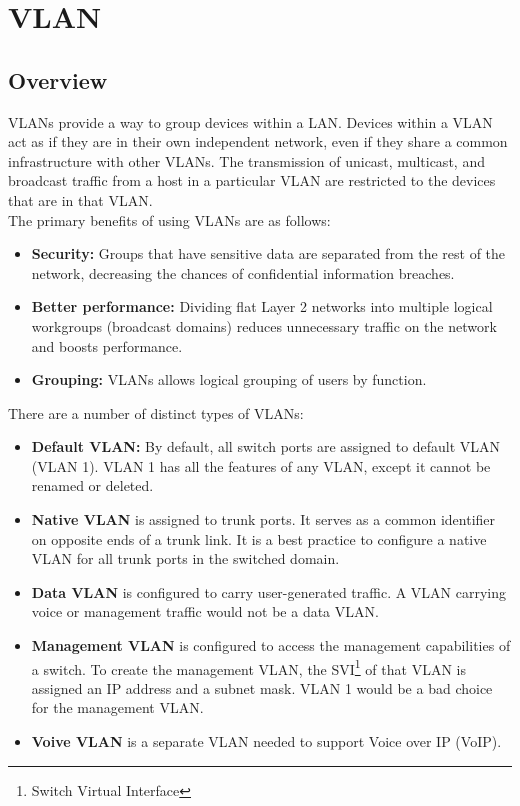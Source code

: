 \chapter{VLAN}

\section{Overview}

VLANs provide a way to group devices within a LAN. Devices within a VLAN act as if they are in their own independent network, even if they share a common infrastructure with other VLANs. The transmission of unicast, multicast, and broadcast traffic from a host in a particular VLAN are restricted to the devices that are in that VLAN.\\

The primary benefits of using VLANs are as follows:

\begin{itemize}
\item \textbf{Security:} Groups that have sensitive data are separated from the rest of the network, decreasing the chances of confidential information breaches. 

\item \textbf{Better performance:} Dividing flat Layer 2 networks into multiple logical workgroups (broadcast domains) reduces unnecessary traffic on the network and
boosts performance.

\item \textbf{Grouping:} VLANs allows logical grouping of users by function. 
\end{itemize}

There are a number of distinct types of VLANs: 

\begin{itemize}
\item \textbf{Default VLAN:} By default, all switch ports are assigned to default VLAN (VLAN 1). VLAN 1 has all the features of any VLAN, except it cannot be renamed or deleted.

\item \textbf{Native VLAN} is assigned to trunk ports. It serves as a common identifier on opposite ends of a trunk link. It is a best practice to configure a native VLAN for all trunk ports in the switched domain.

\item \textbf{Data VLAN} is configured to carry user-generated traffic. A VLAN carrying voice or management traffic would not be a data VLAN. 

\item \textbf{Management VLAN} is configured to access the management capabilities of a switch. To create the management VLAN, the SVI\footnote{Switch Virtual Interface} of that VLAN is assigned an IP address and a subnet mask. VLAN 1 would be a bad choice for the management VLAN.

\item \textbf{Voive VLAN} is a separate VLAN needed to support Voice over IP (VoIP). 
\end{itemize}

